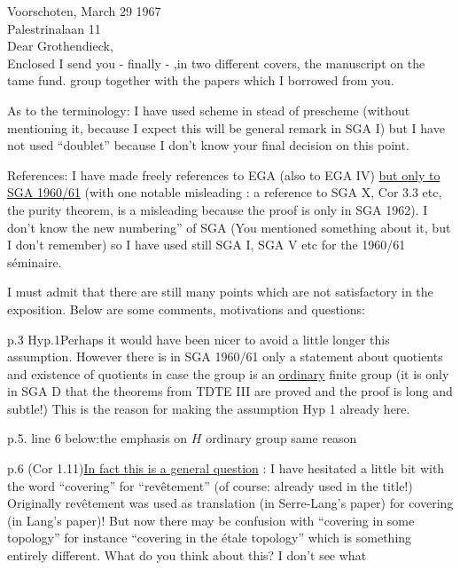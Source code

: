 Voorschoten, March 29 1967\\
Palestrinalaan 11\\

Dear Grothendieck,\\

Enclosed I send you - finally - ,in two different covers, the manuscript on the tame fund. group together with the papers which I borrowed from you.

As to the terminology: I have used scheme in stead of prescheme (without mentioning it, because I expect this will be  general remark in SGA I) but I have not used ``doublet'' because I don't know your final decision on this point.

References: I have made freely references to EGA (also to EGA IV) \uline{but only to SGA 1960/61} (with one notable misleading : a reference to SGA X, Cor 3.3 etc, the purity theorem, is a misleading because the proof is only in SGA 1962). I don't know the new numbering'' of SGA (You mentioned something about it, but I don't remember) so I have used still SGA I, SGA V etc for the 1960/61 séminaire.

I must admit that there are still many points which are not satisfactory in the exposition. Below are some comments, motivations and questions:

p.3 Hyp.1\quad Perhaps it would have been nicer to avoid a little longer this assumption. However there is in SGA 1960/61 only a statement about quotients and existence of quotients in case the group is an \uline{ordinary} finite group (it is only in SGA D that the theorems from TDTE III are proved and the proof is long and subtle!) This is the reason for making the assumption Hyp 1 already here.

p.5. line 6 below:\quad the emphasis on $H$ ordinary group  same reason

p.6 (Cor 1.11)\quad \uline{In fact this is a general question} : I have hesitated a little bit with the word ``covering'' for ``revêtement'' (of course: already used in the title!) Originally revêtement was used as translation  (in Serre-Lang's paper) for covering (in Lang's paper)! But now there may be confusion with ``covering in some topology'' for instance ``covering in the étale topology'' which is something entirely different. What do you think about this? I don't see what
